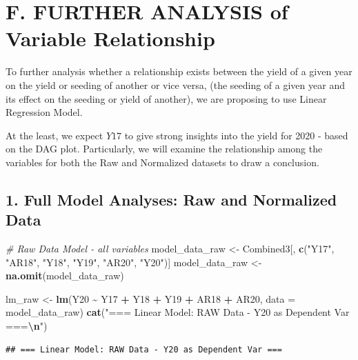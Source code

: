 \documentclass[
]{article}
\newenvironment{Shaded}{\begin{snugshade}}{\end{snugshade}}
\newcommand{\AttributeTok}[1]{\textcolor[rgb]{0.13,0.29,0.53}{#1}}
\newcommand{\CommentTok}[1]{\textcolor[rgb]{0.56,0.35,0.01}{\textit{#1}}}
\newcommand{\FunctionTok}[1]{\textcolor[rgb]{0.13,0.29,0.53}{\textbf{#1}}}
\newcommand{\NormalTok}[1]{#1}
\newcommand{\OtherTok}[1]{\textcolor[rgb]{0.56,0.35,0.01}{#1}}
\newcommand{\SpecialCharTok}[1]{\textcolor[rgb]{0.81,0.36,0.00}{\textbf{#1}}}
\newcommand{\StringTok}[1]{\textcolor[rgb]{0.31,0.60,0.02}{#1}}
\begin{document}
\section{F. FURTHER ANALYSIS of Variable
Relationship}\label{f.-further-analysis-of-variable-relationship}

To further analysis whether a relationship exists between the yield of a
given year on the yield or seeding of another or vice versa, (the
seeding of a given year and its effect on the seeding or yield of
another), we are proposing to use Linear Regression Model.

At the least, we expect \(Y17\) to give strong insights into the yield
for 2020 - based on the DAG plot. Particularly, we will examine the
relationship among the variables for both the Raw and Normalized
datasets to draw a conclusion.

\subsection{1. Full Model Analyses: Raw and Normalized
Data}\label{full-model-analyses-raw-and-normalized-data}

\begin{Shaded}
\begin{Highlighting}[]
\CommentTok{\# Raw Data Model {-} all variables}
\NormalTok{model\_data\_raw }\OtherTok{\textless{}{-}}\NormalTok{ Combined3[, }\FunctionTok{c}\NormalTok{(}\StringTok{"Y17"}\NormalTok{, }\StringTok{"AR18"}\NormalTok{, }\StringTok{"Y18"}\NormalTok{, }\StringTok{"Y19"}\NormalTok{, }\StringTok{"AR20"}\NormalTok{, }\StringTok{"Y20"}\NormalTok{)]}
\NormalTok{model\_data\_raw }\OtherTok{\textless{}{-}} \FunctionTok{na.omit}\NormalTok{(model\_data\_raw)}

\NormalTok{lm\_raw }\OtherTok{\textless{}{-}} \FunctionTok{lm}\NormalTok{(Y20 }\SpecialCharTok{\textasciitilde{}}\NormalTok{ Y17 }\SpecialCharTok{+}\NormalTok{ Y18 }\SpecialCharTok{+}\NormalTok{ Y19 }\SpecialCharTok{+}\NormalTok{ AR18 }\SpecialCharTok{+}\NormalTok{ AR20, }\AttributeTok{data =}\NormalTok{ model\_data\_raw)}
\FunctionTok{cat}\NormalTok{(}\StringTok{"=== Linear Model: RAW Data {-} Y20 as Dependent Var ===}\SpecialCharTok{\textbackslash{}n}\StringTok{"}\NormalTok{)}
\end{Highlighting}
\end{Shaded}

\begin{verbatim}
## === Linear Model: RAW Data - Y20 as Dependent Var ===
\end{verbatim}
\end{document}
